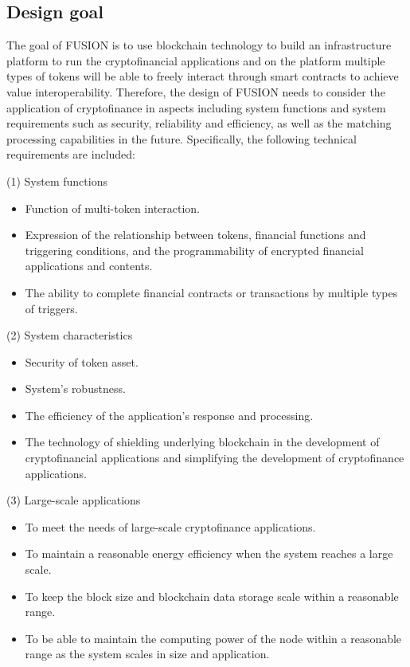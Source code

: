 \documentclass[a4paper,12pt]{article}
\begin{document}
\subsection{Design goal}

The goal of FUSION is to use blockchain technology to build an infrastructure platform to run the cryptofinancial applications and on the platform multiple types of tokens will be able to freely interact through smart contracts to achieve value interoperability. Therefore, the design of FUSION needs to consider the application of cryptofinance in aspects including system functions and system requirements such as security, reliability and efficiency, as well as the matching processing capabilities in the future. Specifically, the following technical requirements are included:

(1) System functions
\begin {itemize} [itemindent = 1em]
\item Function of multi-token interaction.
\item Expression of the relationship between tokens, financial functions and triggering conditions, and the programmability of encrypted financial applications and contents.
\item The ability to complete financial contracts or transactions by multiple types of triggers.
\end {itemize}

(2) System characteristics
\begin {itemize} [itemindent = 1em]
\item Security of token asset.
\item System's robustness.
\item The efficiency of the application's response and processing.
\item The technology of shielding underlying blockchain in the development of cryptofinancial applications and simplifying the development of cryptofinance applications.
\end {itemize}

(3) Large-scale applications
\begin {itemize} [itemindent = 1em]
\item To meet the needs of large-scale cryptofinance applications.
\item To maintain a reasonable energy efficiency when the system reaches a large scale.
\item To keep the block size and blockchain data storage scale within a reasonable range.
\item To be able to maintain the computing power of the node within a reasonable range as the system scales in size and application.
\end {itemize}
\end{document}
